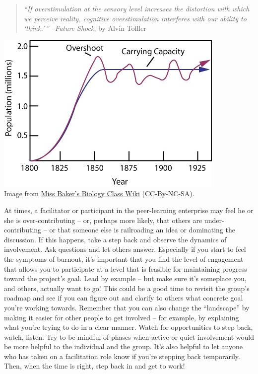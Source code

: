 \begin{quote}
\emph{``If overstimulation at the sensory level increases the distortion
with which we perceive reality, cognitive overstimulation interferes
with our ability to `think.'\,'' --}\emph{Future Shock}, by Alvin
Toffler
\end{quote}

\begin{center}
\includegraphics[width=.65\textwidth]{../pictures/carrying_capacity.jpg} \\
Image from
\href{http://missbakersbiologyclasswiki.wikispaces.com/Ecology+Study+Guide}{Miss
Baker's Biology Class Wiki} (CC-By-NC-SA).
\end{center}

At times, a facilitator or participant in the peer-learning enterprise
may feel he or she is over-contributing -- or, perhaps more likely, that
others are under-contributing -- or that someone else is railroading an
idea or dominating the discussion. If this happens, take a step back and
observe the dynamics of involvement. Ask questions and let others
answer. Especially if you start to feel the symptoms of burnout, it's
important that you find the level of engagement that allows you to
participate at a level that is feasible for maintaining progress toward
the project's goal. Lead by example -- but make sure it's someplace you,
and others, actually want to go! This could be a good time to revisit
the group's roadmap and see if you can figure out and clarify to others
what concrete goal you're working towards. Remember that you can also
change the ``landscape'' by making it easier for other people to get
involved -- for example, by explaining what you're trying to do in a
clear manner. Watch for opportunities to step back, watch, listen. Try
to be mindful of phases when active or quiet involvement would be more
helpful to the individual and the group. It's also helpful to let anyone
who has taken on a facilitation role know if you're stepping back
temporarily. Then, when the time is right, step back in and get to work!
